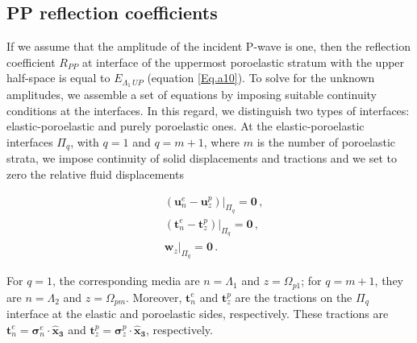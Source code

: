 \documentclass[draft]{agujournal2019}
\begin{document}
\subsection{PP reflection coefficients}
If we assume that the amplitude of the incident P-wave is one, then the reflection coefficient $R_{PP}$ at interface of the uppermost poroelastic stratum with the upper half-space is equal to $E_{\Lambda_1\, UP}$ (equation \eqref{Eq.a10}). To solve for the unknown amplitudes, we assemble a set of equations by imposing suitable continuity conditions at the interfaces.
In this regard, we distinguish two types of interfaces: elastic-poroelastic and purely poroelastic ones. At the elastic-poroelastic interfaces $\Pi_q$, with  $q=1$ and $q=m+1$, where $m$ is the number of poroelastic strata,
we impose continuity of solid displacements and tractions and we set to zero the relative fluid displacements \cite{Deresiewicz1963}
\begin{linenomath*}
\begin{equation}\label{Eq. a18}
\begin{split}
&  \left. \left(  \bm{u}_n^e -  \bm{u}_z^p \right) \right \rvert_{\Pi_q} = \bm{0} \,, \\
&  \left. \left(  \bm{t}_n^e -  \bm{t}_z^p \right) \right \rvert_{\Pi_q} = \bm{0} \,,\\
& \left.  \bm{w}_z \right \rvert_{\Pi_q} = \bm{0} \,.
\end{split}
\end{equation}
\end{linenomath*}
For $q=1$, the corresponding media are $n=\Lambda_1$ and $z=\Omega_{p1}$; for $q=m+1$, they are $n=\Lambda_2$ and $z=\Omega_{pm}$. Moreover, $ \bm{t}_n^e$ and $\bm{t}_z^p$ are the tractions on the $\Pi_q$ interface at the elastic and poroelastic sides, respectively. These tractions are $ \bm{t}_n^e =\bm{ \sigma}_n^e \cdot \bm{\hat{x}_3}$ and $ \bm{t}_z^p = \bm{\sigma}_z^p \cdot \bm{\hat{x}_3}$, respectively.
\end{document}
